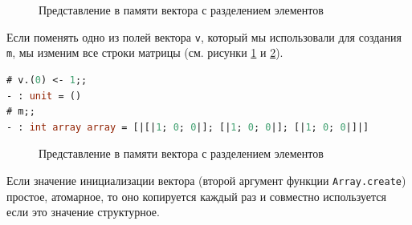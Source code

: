 \begin{figure}[h]
	\caption{Представление в памяти вектора с разделением элементов}
	\label{fig:memory_representation_of_a_vector_sharing_its_elements}
\end{figure}

Если поменять одно из полей вектора \texttt{v}, который мы использовали для
создания \texttt{m}, мы изменим все строки матрицы (см. рисунки
\ref{fig:memory_representation_of_a_vector_sharing_its_elements} и
\ref{fig:modification_of_shared_elements_of_a_vector}).

\begin{lstlisting}[language=OCaml]
# v.(0) <- 1;;
- : unit = ()
# m;;
- : int array array = [|[|1; 0; 0|]; [|1; 0; 0|]; [|1; 0; 0|]|]
\end{lstlisting}

\begin{figure}[h]
	\caption{Представление в памяти вектора с разделением элементов}
	\label{fig:modification_of_shared_elements_of_a_vector}
\end{figure}

Если значение инициализации вектора (второй аргумент функции
\texttt{Array.create}) простое, атомарное, то оно копируется каждый раз и
совместно используется если это значение структурное.

